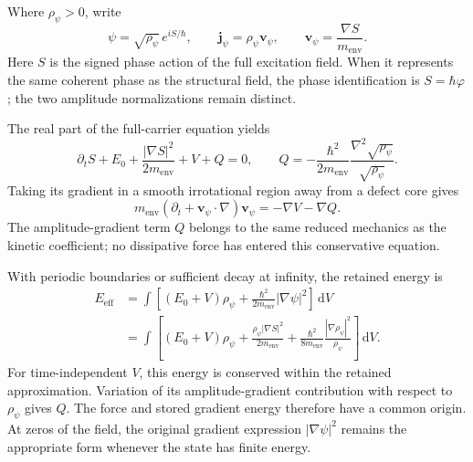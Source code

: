 Where $\rho_\psi>0$, write
\begin{equation}
    \psi=\sqrt{\rho_\psi}\,e^{iS/\hbar},
    \qquad
    \mathbf j_\psi=\rho_\psi\mathbf v_\psi,
    \qquad
    \mathbf v_\psi=\frac{\nabla S}{m_{\mathrm{env}}}.
\end{equation}
Here $S$ is the signed phase action of the full excitation field. When it represents the same coherent phase as the structural field, the phase identification is $S=\hbar\varphi$; the two amplitude normalizations remain distinct.

The real part of the full-carrier equation yields
\begin{equation}
    \partial_tS+E_0
    +\frac{|\nabla S|^2}{2m_{\mathrm{env}}}+V+Q=0,
    \qquad
    \boxed{
    Q=-\frac{\hbar^2}{2m_{\mathrm{env}}}
    \frac{\nabla^2\sqrt{\rho_\psi}}{\sqrt{\rho_\psi}}
    }.
    \label{eq:X_phase_force_potential}
\end{equation}
Taking its gradient in a smooth irrotational region away from a defect core gives
\begin{equation}
    m_{\mathrm{env}}
    (\partial_t+\mathbf v_\psi\cdot\nabla)\mathbf v_\psi
    =-\nabla V-\nabla Q.
\end{equation}
The amplitude-gradient term $Q$ belongs to the same reduced mechanics as the kinetic coefficient; no dissipative force has entered this conservative equation.

With periodic boundaries or sufficient decay at infinity, the retained energy is
\begin{align}
    E_{\mathrm{eff}}
    &=\int\left[(E_0+V)\rho_\psi
        +\frac{\hbar^2}{2m_{\mathrm{env}}}|\nabla\psi|^2\right]
        \,\mathrm dV
    \nonumber\\
    &=\int\left[(E_0+V)\rho_\psi
        +\frac{\rho_\psi|\nabla S|^2}{2m_{\mathrm{env}}}
        +\frac{\hbar^2}{8m_{\mathrm{env}}}
        \frac{|\nabla\rho_\psi|^2}{\rho_\psi}\right]\,\mathrm dV.
    \label{eq:X_effective_energy}
\end{align}
For time-independent $V$, this energy is conserved within the retained approximation. Variation of its amplitude-gradient contribution with respect to $\rho_\psi$ gives $Q$. The force and stored gradient energy therefore have a common origin. At zeros of the field, the original gradient expression $|\nabla\psi|^2$ remains the appropriate form whenever the state has finite energy.

